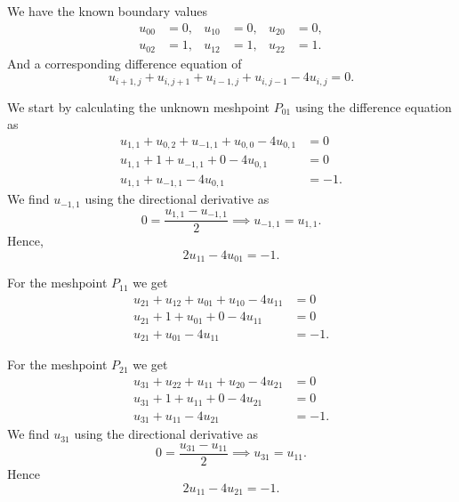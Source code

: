 \begin{derivation}
  We have the known boundary values
  \begin{align*}
    u_{00} &= 0, & u_{10} &= 0, & u_{20} &= 0, \\
    u_{02} &= 1, & u_{12} &= 1, & u_{22} &= 1
  .\end{align*}
  And a corresponding difference equation of
  \begin{equation*}
    u_{i+1,j} + u_{i,j+1} + u_{i-1,j} + u_{i,j-1} - 4u_{i,j} = 0
  .\end{equation*}
  
  We start by calculating the unknown meshpoint $P_{01}$ using the difference equation as
  \begin{align*}
    u_{1,1} + u_{0,2} + u_{-1,1} + u_{0,0} - 4u_{0,1} &= 0 \\
    u_{1,1} + 1 + u_{-1,1} + 0 - 4u_{0,1} &= 0 \\
    u_{1,1} +u_{-1,1} - 4u_{0,1} &= -1
  .\end{align*}
  We find $u_{-1,1}$ using the directional derivative as
  \begin{equation*}
    0 = \frac{u_{1,1} - u_{-1,1}}{2} \implies u_{-1,1} = u_{1,1}
  .\end{equation*}
  Hence,
  \begin{equation*}
    2u_{11} - 4u_{01} = -1
  .\end{equation*}
  
  For the meshpoint $P_{11}$ we get
  \begin{align*}
    u_{21} + u_{12} + u_{01} + u_{10} - 4u_{11} &= 0 \\
    u_{21} + 1 + u_{01} + 0 - 4u_{11} &= 0 \\
    u_{21} + u_{01} -4u_{11} &= -1
  .\end{align*}

  For the meshpoint $P_{21}$ we get
  \begin{align*}
    u_{31} + u_{22} + u_{11} + u_{20} - 4u_{21} &= 0 \\
    u_{31} + 1 + u_{11} + 0 - 4u_{21} &= 0 \\
    u_{31} + u_{11} - 4u_{21} &= -1
  .\end{align*}
  We find $u_{31}$ using the directional derivative as
  \begin{equation*}
    0 = \frac{u_{31} - u_{11}}{2} \implies u_{31} = u_{11}
  .\end{equation*}
  Hence
  \begin{equation*}
    2u_{11} - 4u_{21} = -1
  .\end{equation*}
\end{derivation}

